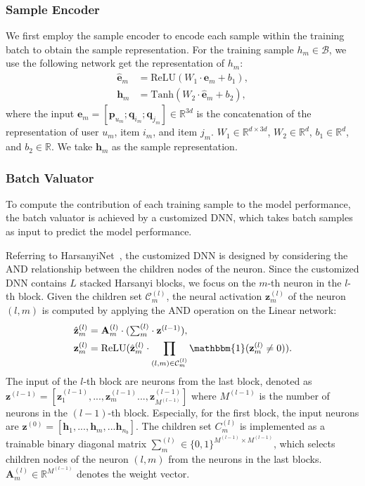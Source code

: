 \subsubsection{Sample Encoder}
We first employ the sample encoder to encode each sample within the training batch to obtain the sample representation. For the training sample $h_m\in \mathcal{B}$, we use the following network get the representation of $h_m$:
\begin{equation}
    \begin{aligned}
        \hat{\mathbf{e}}_{m} &= \text{ReLU}(W_1\cdot  \mathbf{e}_{m}+b_1),\\
        \mathbf{h}_{m} &= \text{Tanh}(W_2 \cdot \hat{\mathbf{e}}_{m}+b_2),
    \end{aligned}
\end{equation}
where the input $\mathbf{e}_{m}=[\mathbf{p}_{u_m}; \mathbf{q}_{i_m}; \mathbf{q}_{j_m}]\in \mathbb{R}^{3d}$ is the concatenation of the representation of user $u_m$, item $i_m$, and item $j_m$. $W_1\in \mathbb{R}^{d \times 3d}$, $W_2\in \mathbb{R}^{d}$, $b_1\in \mathbb{R}^{d}$, and $b_2\in \mathbb{R}$. We take $\mathbf{h}_{m}$ as the sample representation.

\subsubsection{Batch Valuator}
To compute the contribution of each training sample to the model performance, the batch valuator is achieved by a customized DNN, which takes batch samples as input to predict the model performance. 

Referring to HarsanyiNet~\cite{chen2023harsanyinet}, the customized DNN is designed by considering the AND relationship between the children nodes of the neuron. Since the customized DNN contains $L$ stacked Harsanyi blocks, we focus on the $m$-th neuron in the $l$-th block. Given the children set $\mathcal{C}_m^{(l)}$, the neural activation $\mathbf{z}_m^{(l)}$ of the neuron $(l, m)$ is computed by applying the AND operation on the Linear network:
\begin{equation}
    \begin{aligned}
        \hat{\mathbf{z}}_m^{(l)}&=\mathbf{A}_m^{(l)}\cdot (\textstyle{\sum_m^{(l)}}\cdot \mathbf{z}^{(l-1)}),\\
        \mathbf{z}_m^{(l)}&=\text{ReLU}(\hat{\mathbf{z}}_m^{(l)}\cdot\prod_{(l,m)\in\mathcal{C}_{m}^{(l)}}\mathbbm{1}(\mathbf{z}_{m}^{(l)}\neq 0)).
    \end{aligned}
\end{equation}
 The input of the $l$-th block are neurons from the last block, denoted as $\mathbf{z}^{(l-1)}=[\mathbf{z}_1^{(l-1)},...,\mathbf{z}_m^{(l-1)}...,\mathbf{z}_{M^{(l-1)}}^{(l-1)}]$ where $M^{(l-1)}$ is the number of neurons in the $(l-1)$-th block. Especially, for the first block, the input neurons are $\mathbf{z}^{(0)}=[\mathbf{h}_1, ...,\mathbf{h}_m,... \mathbf{h}_{n_b}]$. The children set $C_m^{(l)}$ is implemented as a trainable binary diagonal matrix $\textstyle{\sum_m^{(l)}}\in \{0,1\}^{M^{(l-1)}\times M^{(l-1)}}$, which selects children nodes of the neuron $(l, m)$ from the neurons in the last blocks. $\mathbf{A}_m^{(l)}\in \mathbb{R}^{M^{(l-1)}}$ denotes the weight vector. 
 
